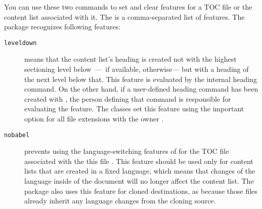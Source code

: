 \begin{Declaration}
\end{Declaration}
You can use these two commands to set and clear features for a TOC file
 or the content list associated with it. The  is a comma-separated list of features. The  package
recognizes following features:
\begin{description}
\item[\texttt{leveldown}] means that the content list's heading is created not
  with the highest sectioning level below
  \,---\, if available,
   otherwise\,---\,but with a heading of the next
  level below that. This feature is evaluated by the internal heading command.
  On the other hand, if a user-defined heading command has been created with
  , the person defining that command is
  responsible for evaluating the feature. The \KOMAScript{} classes set this
  feature using the %
  important{}%
   option for all file extensions
  with the owner .
\item[\texttt{nobabel}] prevents using the language-switching features of
   for the TOC file associated with the
  this file . This feature should be used only for content
  lists that are created in a fixed language, which means that changes of the
  language inside of the document will no longer affect the content list. The
  package also uses this feature for cloned destinations, as because those
  files already inherit any language changes from the cloning source.


\end{description}

